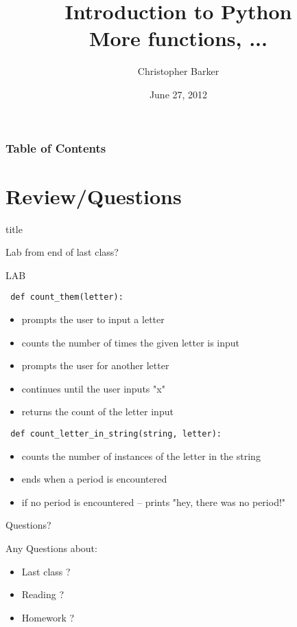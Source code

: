 \documentclass{beamer}
\title[Intro to Python: Week 2]{Introduction  to Python\\ More functions, ...}
\author{Christopher Barker}
\institute{UW Continuing Education / Isilon}
\date{June 27, 2012}
\begin{document}
\begin{frame}
  \titlepage
\end{frame}

\begin{frame}
\frametitle{Table of Contents}
  \tableofcontents
\end{frame}


\section{Review/Questions}


\begin{frame}{title}

{\Large Lab from end of last class?  }

\end{frame}


\begin{frame}[fragile]{LAB}

\verb| def count_them(letter): |
\begin{itemize}
  \item prompts the user to input a letter
  \item counts the number of times the given letter is input
  \item prompts the user for another letter
  \item continues until the user inputs "x"
  \item returns the count of the letter input
\end{itemize}

\verb| def count_letter_in_string(string, letter): |
\begin{itemize}
  \item counts the number of instances of the letter in the string
  \item ends when a period is encountered
  \item if no period is encountered -- prints "hey, there was no period!"
\end{itemize}
\end{frame}


\begin{frame}{Questions?}

{\Large Any Questions about:
\begin{itemize}
  \item Last class ?
  \item Reading ?
  \item Homework ?
\end{itemize}
}
\end{frame}
\end{document}
